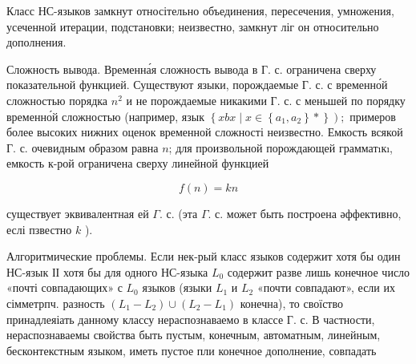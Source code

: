 \documentclass[10pt]{article}
\begin{document}
Класс НС-языков замкнут относітельно объединения, пересечения, умножения, усеченной итерации, подстановки; неизвестно, замкнут ліг он относительно дополнения.



Сложность вывода. Временна́я сложность вывода в Г. с. ограничена сверху показательной функцией. Существуют языки, порождаемые Г. с. с временно́й сложностью порядка $n^{2}$ и не порождаемые никакими Г. с. с меньшей по порядку временно́й сложностью (например, язык $\left.\left\{x b x \mid x \in\left\{a_{1}, a_{2}\right\} *\right\}\right) ;$ примеров более высоких нижних оценок временной сложності неизвестно. Емкость всякой Г. с. очевидным образом равна $n$; для произвольной порождающей грамматıкı, емкость к-рой ограничена сверху линейной функцией



\[

f(n)=k n

\]



существует эквивалентная ей $\Gamma$. с. (эта $\Gamma$. с. может быть построена әффективно, еслі пзвестно $k$ ).



Алгоритмические проблемы. Если нек-рый класс языков содержит хотя бы один НС-язык ІІ хотя бы для одного НС-языка $L_{0}$ содержит разве лишь конечное число «почті совпадающих» с $L_{0}$ языков (языки $L_{1}$ и $L_{2}$ «почти совпадают», если их сімметрпч. разность $\left(L_{1}-L_{2}\right) \cup\left(L_{2}-L_{1}\right)$ конечна), то своїство принадлеяіать данному классу нераспознаваемо в классе Г. с. В частности, нераспознаваемы свойства быть пустым, конечным, автоматным, линейным, бесконтекстным языком, иметь пустое пли конечное дополнение, совпадать
\end{document}
